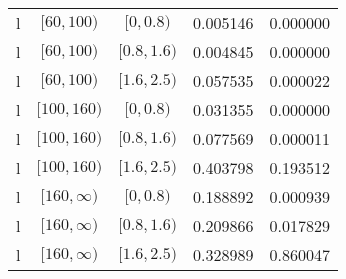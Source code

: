 \documentclass[12pt,a4paper]{article}
\begin{document}
\begin{table}[H]
\begin{center}
\begin{tabular}{ c | c | c | c | c }
		l & $[60,100)$ & $[0,0.8)$ & 0.005146 & 0.000000 \\
		l & $[60,100)$ & $[0.8,1.6)$ & 0.004845 & 0.000000 \\
		l & $[60,100)$ & $[1.6,2.5)$ & 0.057535 & 0.000022 \\
		l & $[100,160)$ & $[0,0.8)$ & 0.031355 & 0.000000 \\
		l & $[100,160)$ & $[0.8,1.6)$ & 0.077569 & 0.000011 \\
		l & $[100,160)$ & $[1.6,2.5)$ & 0.403798 & 0.193512 \\
		l & $[160,\infty)$ & $[0,0.8)$ & 0.188892 & 0.000939 \\
		l & $[160,\infty)$ & $[0.8,1.6)$ & 0.209866 & 0.017829 \\
		l & $[160,\infty)$ & $[1.6,2.5)$ & 0.328989 & 0.860047 \\
	\end{tabular}
\end{center}
\end{table}
\end{document}
